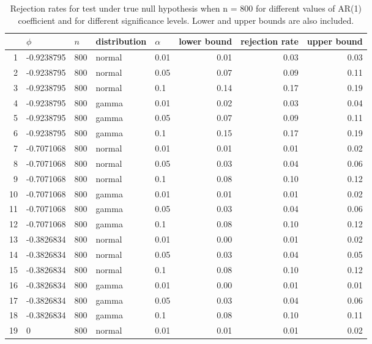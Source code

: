 \begin{table}[ht]
\centering
\caption{Rejection rates for test under true null hypothesis
                   when n = 800 for 
                   different values of AR(1) coefficient and for different 
                   significance levels. Lower and upper bounds are also 
                   included.} 
\label{table:rr_800}
\begin{tabular}{rllllrrr}
  \hline
 & $\phi$ & $n$ & distribution & $\alpha$ & lower bound & rejection rate & upper bound \\ 
  \hline
1 & -0.9238795 & 800 & normal & 0.01 & 0.01 & 0.03 & 0.03 \\ 
  2 & -0.9238795 & 800 & normal & 0.05 & 0.07 & 0.09 & 0.11 \\ 
  3 & -0.9238795 & 800 & normal & 0.1 & 0.14 & 0.17 & 0.19 \\ 
  4 & -0.9238795 & 800 & gamma & 0.01 & 0.02 & 0.03 & 0.04 \\ 
  5 & -0.9238795 & 800 & gamma & 0.05 & 0.07 & 0.09 & 0.11 \\ 
  6 & -0.9238795 & 800 & gamma & 0.1 & 0.15 & 0.17 & 0.19 \\ 
  7 & -0.7071068 & 800 & normal & 0.01 & 0.01 & 0.01 & 0.02 \\ 
  8 & -0.7071068 & 800 & normal & 0.05 & 0.03 & 0.04 & 0.06 \\ 
  9 & -0.7071068 & 800 & normal & 0.1 & 0.08 & 0.10 & 0.12 \\ 
  10 & -0.7071068 & 800 & gamma & 0.01 & 0.01 & 0.01 & 0.02 \\ 
  11 & -0.7071068 & 800 & gamma & 0.05 & 0.03 & 0.04 & 0.06 \\ 
  12 & -0.7071068 & 800 & gamma & 0.1 & 0.08 & 0.10 & 0.12 \\ 
  13 & -0.3826834 & 800 & normal & 0.01 & 0.00 & 0.01 & 0.02 \\ 
  14 & -0.3826834 & 800 & normal & 0.05 & 0.03 & 0.04 & 0.05 \\ 
  15 & -0.3826834 & 800 & normal & 0.1 & 0.08 & 0.10 & 0.12 \\ 
  16 & -0.3826834 & 800 & gamma & 0.01 & 0.00 & 0.01 & 0.01 \\ 
  17 & -0.3826834 & 800 & gamma & 0.05 & 0.03 & 0.04 & 0.06 \\ 
  18 & -0.3826834 & 800 & gamma & 0.1 & 0.08 & 0.10 & 0.11 \\ 
  19 & 0 & 800 & normal & 0.01 & 0.01 & 0.01 & 0.02 \\ 

\end{tabular}
\end{table}
